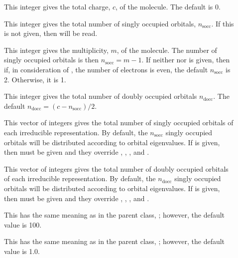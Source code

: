 \begin{description}
  \item[] This integer gives the total charge, $c$, of
     the molecule.  The default is 0.

  \item[] This integer gives the total number of singly
     occupied orbitals, $n_\mathrm{socc}$.  If this is not given, then
      will be read.

  \item[] This integer gives the multiplicity, $m$, of
     the molecule.  The number of singly occupied orbitals is then
     $n_\mathrm{socc} = m - 1$.  If neither  nor
      is given, then if, in consideration of
     , the number of electrons is even, the default
     $n_\mathrm{socc}$ is 2.  Otherwise, it is 1.

  \item[] This integer gives the total number of doubly
     occupied orbitals $n_\mathrm{docc}$.  The default $n_\mathrm{docc} =
     (c - n_\mathrm{socc})/2$.

  \item[] This vector of integers gives the total number of
     singly occupied orbitals of each irreducible representation.  By
     default, the $n_\mathrm{socc}$ singly occupied orbitals will be
     distributed according to orbital eigenvalues.  If  is
     given, then  must be given and they override
     , , , and
     .

  \item[] This vector of integers gives the total number of
     doubly occupied orbitals of each irreducible representation.  By
     default, the $n_\mathrm{docc}$ singly occupied orbitals will be
     distributed according to orbital eigenvalues.  If  is
     given, then  must be given and they override
     , , , and
     .

  \item[] This has the same meaning as in the parent
     class, ; however, the default value is 100.

  \item[] This has the same meaning as in the parent
     class, ; however, the default value is 1.0.

\end{description}
